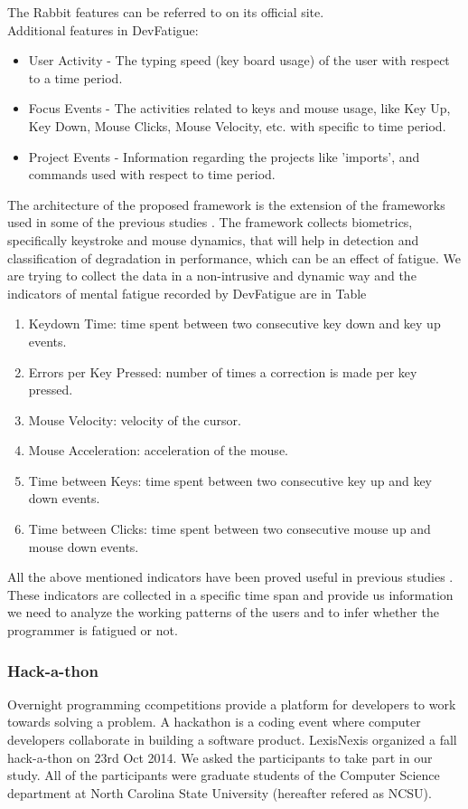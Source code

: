 \documentclass{acm_proc_article-sp}
\begin{document}
The Rabbit features can be referred to on its official
site\footnotemark[\ref{rabbitNote}].\\
Additional features in DevFatigue:
\begin{itemize}
	\item User Activity - The typing speed (key board usage) of the user with
	respect to a time period.
	\item Focus Events - The activities related to keys and mouse usage, like Key
	Up, Key Down, Mouse Clicks, Mouse Velocity, etc. with specific to time period.
	\item Project Events - Information regarding the projects like 'imports', and
	commands used with respect to time period.
\end{itemize}
The architecture of the proposed framework is the extension of the frameworks
used in some of the previous studies \cite{pimenta:analysis}. The framework
collects biometrics, specifically keystroke and mouse dynamics, that will
help in detection and classification of degradation in performance, which can
be an effect of fatigue. We are trying to collect the data in a non-intrusive
and dynamic way and the indicators of mental fatigue recorded by DevFatigue are
in Table 
  	\begin{enumerate}
   		\item Keydown Time: time spent between two consecutive key down and key up
   		events.
   		\item Errors per Key Pressed: number of times a correction is made per key
   		pressed.
   		\item Mouse Velocity: velocity of the cursor.
   		\item Mouse Acceleration: acceleration of the mouse.
   		\item Time between Keys: time spent between two consecutive key up and key
   		down events.
   		\item Time between Clicks: time spent between two consecutive mouse up and
   		mouse down events.
    \end{enumerate}
All the above mentioned indicators have been proved useful in previous studies
\cite{pimenta:monitor} \cite{pimenta:analysis}. These indicators are
collected in a specific time span and provide us information we need to analyze
the working patterns of the users and to infer whether the programmer is
fatigued or not.

\subsubsection{Hack-a-thon}
Overnight programming ccompetitions provide a platform for developers to work
towards solving a problem. A hackathon is a coding event where computer
developers collaborate in building a software product. LexisNexis organized a
fall hack-a-thon on 23rd Oct 2014. We asked the participants to take part in our
study. All of the participants were graduate students of the Computer Science
department at North Carolina State University (hereafter refered as NCSU).
\end{document}
